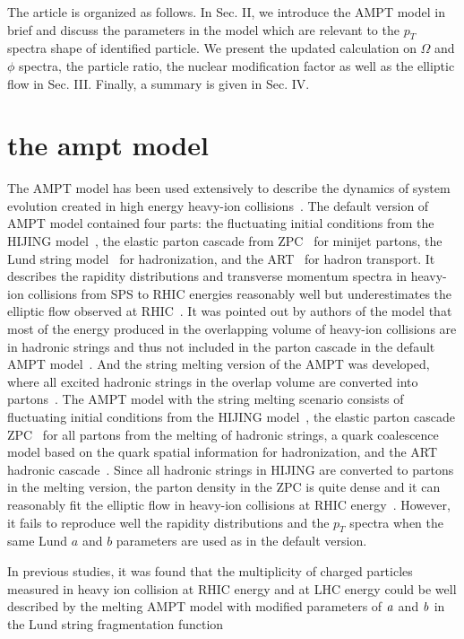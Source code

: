 \documentclass[twocolumn,aps,prc,showpacs,superscriptaddress,preprintnumbers,floatfix,nofootinbib]{revtex4}
\begin{document}
\begin{CJK*}{GBK}{song}
The article is organized as follows. In Sec. II, we introduce the AMPT model in brief and discuss the parameters in the model which are relevant to the $p_T$ spectra shape of identified particle. We present the updated calculation on $\Omega$ and $\phi$ spectra, the particle ratio, the nuclear modification factor as well as the elliptic flow in Sec. III. Finally, a summary is given in Sec. IV.

\section{the ampt model}

The AMPT model has been used extensively to describe the dynamics of system evolution created in high energy heavy-ion collisions~\cite{AMPT-model}. The default version of AMPT model contained four parts: the fluctuating initial conditions from the HIJING model~\cite{HIJING}, the elastic parton cascade from ZPC~\cite{ZPC} for minijet partons, the Lund string model~\cite{Lund} for hadronization, and the ART~\cite{ART} for hadron transport. It describes the rapidity distributions and transverse momentum spectra in heavy-ion collisions from SPS to RHIC energies reasonably well but underestimates the elliptic flow observed at RHIC~\cite{AMPT-model}. It was pointed out by authors of the model that most of the energy produced in the overlapping volume of heavy-ion collisions are in hadronic strings and thus not included in the parton cascade in the default AMPT model~\cite{Lin2002}. And the string melting version of the AMPT was developed, where all excited hadronic strings in the overlap volume are converted into partons~\cite{Lin2002}. The AMPT model with the string melting scenario consists of fluctuating initial conditions from the HIJING model~\cite{HIJING}, the elastic parton cascade ZPC~\cite{ZPC} for all partons from the melting of hadronic strings, a quark coalescence model based on the quark spatial information for hadronization, and the ART hadronic cascade~\cite{ART}. Since all hadronic strings in HIJING are converted to partons in the melting version, the parton density in the ZPC is quite dense and it can reasonably fit the elliptic flow in heavy-ion collisions at RHIC energy~\cite{AMPT-model}. However, it fails to reproduce well the rapidity distributions and the $p_T$ spectra when  the same Lund $a$ and $b$ parameters are used as in the default version.

In previous studies, it was found that the multiplicity of charged particles measured in heavy ion collision at RHIC energy and at LHC energy could be well described by the melting AMPT model with modified parameters of $\it {a}$ and $\it b$ in the Lund string fragmentation function ~\cite{ab,ablin1}


\end{CJK*}
\end{document}

